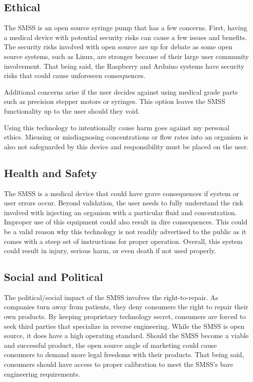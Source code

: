 \documentclass[journal]{IEEEtran}
\begin{document}
    \subsection{Ethical}
        The SMSS is an open source syringe pump that has a few concerns. First, having a medical device with potential security risks can cause a few issues and benefits. The security risks involved with open source are up for debate as some open source systems, such as Linux, are stronger because of their large user community involvement. That being said, the Raspberry and Arduino systems have security risks that could cause unforeseen consequences.

        Additional concerns arise if the user decides against using medical grade parts such as precision stepper motors or syringes. This option leaves the SMSS functionality up to the user should they void.

        Using this technology to intentionally cause harm goes against my personal ethics. Misusing or misdiagnosing concentrations or flow rates into an organism is also not safeguarded by this device and responsibility must be placed on the user.

    \subsection{Health and Safety}
        The SMSS is a medical device that could have grave consequences if system or user errors occur. Beyond validation, the user needs to fully understand the risk involved with injecting an organism with a particular fluid and concentration. Improper use of this equipment could also result in dire consequences. This could be a valid reason why this technology is not readily advertised to the public as it comes with a steep set of instructions for proper operation. Overall, this system could result in injury, serious harm, or even death if not used properly.

    \subsection{Social and Political}
        The political/social impact of the SMSS involves the right-to-repair. As
        companies turn away from patients, they deny consumers the right to repair their own products. By keeping proprietary technology secret, consumers are forced to seek third parties that specialize in reverse engineering. While the SMSS is open source, it does have a high operating standard. Should the SMSS become a viable and successful product, the open source angle of marketing could cause consumers to demand more legal freedoms with their products. That being said, consumers should have access to proper calibration to meet the SMSS’s bare engineering requirements.
\end{document}
